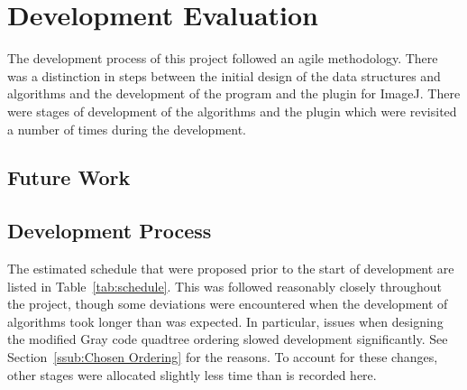 
\section{Development Evaluation}
\label{sec:development_evaluation}

The development process of this project followed an agile methodology. There
was a distinction in steps between the initial design of the data structures
and algorithms and the development of the program and the plugin for ImageJ.
There were stages of development of the algorithms and the plugin which were
revisited a number of times during the development.

\subsection{Future Work}
\label{sub:future_work}


\subsection{Development Process}
\label{sub:development_process}

The estimated schedule that were proposed prior to the start of development
are listed in Table~\ref{tab:schedule}. This was followed reasonably closely
throughout the project, though some deviations were encountered when the
development of algorithms took longer than was expected. In particular, issues
when designing the modified Gray code quadtree ordering slowed development
significantly. See Section~\ref{ssub:Chosen Ordering} for the reasons. To
account for these changes, other stages were allocated slightly less time than
is recorded here.

